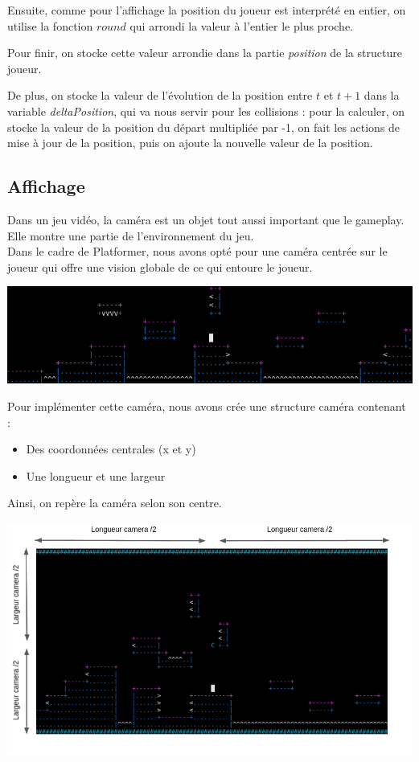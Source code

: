 \documentclass[12pt]{article}
\begin{document}
		Ensuite, comme pour l'affichage la position du joueur est interprété en entier, on utilise la fonction \(round\) qui arrondi la valeur à l'entier le plus proche.
		
		Pour finir, on stocke cette valeur arrondie dans la partie \textit{position} de la structure joueur.
		
		\medskip
		De plus, on stocke la valeur de l'évolution de la position entre \(t\) et \(t+1\) dans la variable \textit{deltaPosition}, qui va nous servir pour les collisions : pour la calculer, on stocke la valeur de la position du départ multipliée par -1, on fait les actions de mise à jour de la position, puis on ajoute la nouvelle valeur de la position.
		
		\newpage
		
		\subsection{Affichage}

		Dans un jeu vidéo, la caméra est un objet tout aussi important que le gameplay.
		Elle montre une partie de l'environnement du jeu. \\
		
		
		Dans le cadre de Platformer, nous avons opté pour une caméra centrée sur le joueur qui offre une vision globale de ce qui entoure le joueur.
		\begin{center}
			\includegraphics[width = 0.80 \textwidth]{content/affichage1.png}
		\end{center}
		
		Pour implémenter cette caméra, nous avons crée une structure caméra contenant :
		\begin{itemize}
			\item Des coordonnées centrales (x et y)
			\item Une longueur et une largeur \\
		\end{itemize}
		
		
		Ainsi, on repère la caméra selon son centre.
		\begin{center}
			\includegraphics[width = 0.70 \textwidth]{content/affichage2.png}
		\end{center}
		
\end{document}

